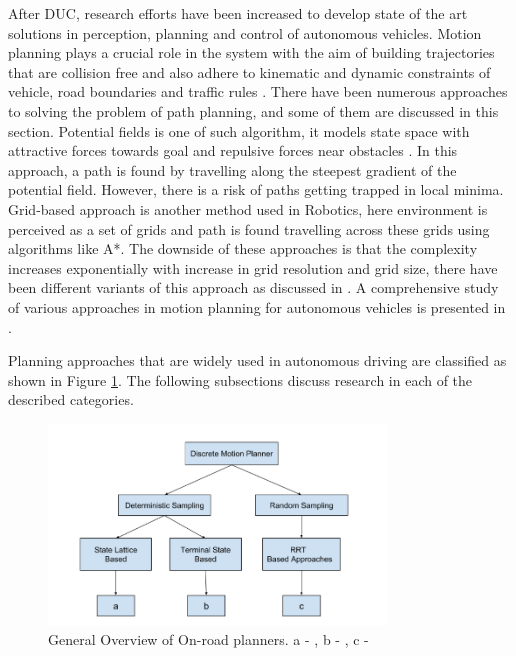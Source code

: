 After DUC, research efforts have been increased to develop state of the art solutions in perception, planning and control of autonomous vehicles. Motion planning plays a crucial role in the system with the aim of building trajectories that are collision free and also adhere to kinematic and dynamic constraints of vehicle, road boundaries and traffic rules \cite{motion_planning_techniques}. There have been numerous approaches to solving the problem of path planning, and some of them are discussed in this section. Potential fields is one of such algorithm, it models state space with attractive forces towards goal and repulsive forces near obstacles \cite{potential_field_3} \cite{potential_field_1} \cite{potential_field_2}. In this approach, a path is found by travelling along the steepest gradient of the potential field. However, there is a risk of paths getting trapped in local minima. Grid-based approach is another method used in Robotics, here environment is perceived as a set of grids and path is found travelling across these grids using algorithms like A*. The downside of these approaches is that the complexity increases exponentially with increase in grid resolution and grid size, there have been different variants of this approach as discussed in \cite{A_star} \cite{D_star_1} \cite{kolski_thesis}. A comprehensive study of various approaches in motion planning for autonomous vehicles is presented in \cite{motion_planning_techniques} \cite{survey_planning_techniques}.

 Planning approaches that are widely used in autonomous driving are classified as shown in Figure \ref{related_work_classification}. The following subsections discuss research in each of the described categories. 

\begin{figure}[H]
	\centering
	\includegraphics[width=0.8\textwidth]{Images/related_work/planning_division.png}
	\caption{General Overview of On-road planners. a - \cite{cmu_parallel_thesis}  \cite{diss_shui_phd_thesis} \cite{traj_planner_optimization} \cite{lattice_Gu_Tiyanu} \cite{unit_A_star} , b - \cite{kolski_thesis} \cite{real_time_traj_plan_article} \cite{darpa_urban_challenge}, c -\cite{rrt_star} \cite{rrt_urban_driv} \cite{mit_rrt}
	}
	\label{related_work_classification}
\end{figure}

